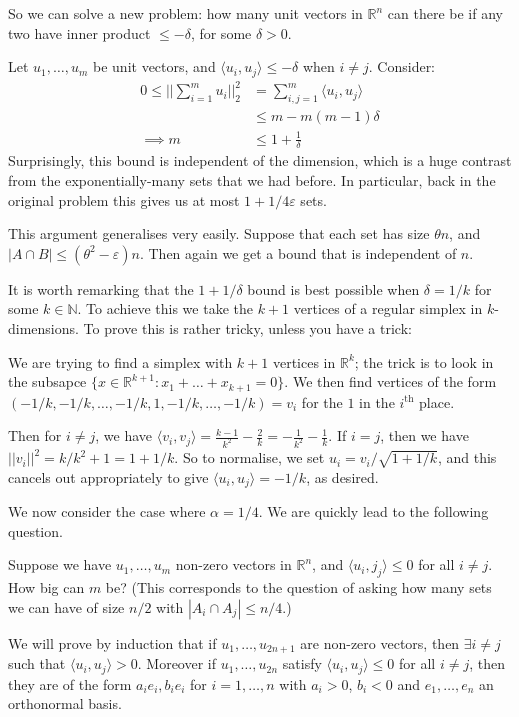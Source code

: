 \documentclass[]{article}
\theoremstyle{custhm}
\theoremstyle{cusdef}
\theoremstyle{custhm}
\theoremstyle{custhm}
\theoremstyle{custhm}
\theoremstyle{custhm}
\theoremstyle{cusdef}
\theoremstyle{remark}
\theoremstyle{custhm}
\newcommand{\N}{\mathbb{N}}
\newcommand{\R}{\mathbb{R}}
\newcommand{\eps}{\varepsilon}
\begin{document}
So we can solve a new problem: how many unit vectors in $\R^n$ can there be if any two have inner product $\le -\delta$, for some $\delta > 0$.

Let $u_1,\dots,u_m$ be unit vectors, and $\langle u_i,u_j\rangle \le -\delta$ when $i\ne j$. Consider:
\begin{align*}
0\le ||\sum_{i=1}^{m}u_i||^2_2 &= \sum_{i,j=1}^{m}\langle u_i, u_j\rangle\\
&\le m - m(m-1)\delta\\
\implies m &\le 1 + \frac{1}{\delta}
\end{align*}
Surprisingly, this bound is independent of the dimension, which is a huge contrast from the exponentially-many sets that we had before. In particular, back in the original problem this gives us at most $1 + 1/4\eps$ sets.

This argument generalises very easily. Suppose that each set has size $\theta n$, and $|A \cap B|\le (\theta^2 - \eps)n$. Then again we get a bound that is independent of $n$.

It is worth remarking that the $1 + 1/\delta$ bound is best possible when $\delta = 1/k$ for some $k \in \N$. To achieve this we take the $k+1$ vertices of a regular simplex in $k$-dimensions. To prove this is rather tricky, unless you have a trick:

We are trying to find a simplex with $k+1$ vertices in $\R^k$; the trick is to look in the subsapce $\{x\in \R^{k+1}:x_1+\dots+x_{k+1} = 0\}$. We then find vertices of the form $(-1/k,-1/k,\dots,-1/k,1,-1/k,\dots,-1/k) = v_i$ for the $1$ in the $i^{\textrm{th}}$ place.

Then for $i\ne j$, we have $\langle v_i,v_j\rangle = \frac{k-1}{k^2} - \frac{2}{k} = -\frac{1}{k^2} - \frac{1}{k}$. If $i=j$, then we have $||v_i||^2 = k/k^2 + 1 = 1 + 1/k$. So to normalise, we set $u_i = v_i/\sqrt{1+1/k}$, and this cancels out appropriately to give $\langle u_i, u_j\rangle = - 1/k$, as desired.


We now consider the case where $\alpha = 1/4$. We are quickly lead to the following question.

Suppose we have $u_1,\dots,u_m$ non-zero vectors in $\R^n$, and $\langle u_i,j_j\rangle \le 0$ for all $i\ne j$. How big can $m$ be? (This corresponds to the question of asking how many sets we can have of size $n/2$ with $|A_i\cap A_j| \le n/4$.)

We will prove by induction that if $u_1,\dots,u_{2n+1}$ are non-zero vectors, then $\exists i\ne j$ such that $\langle u_i,u_j\rangle > 0$. Moreover if $u_1,\dots,u_{2n}$ satisfy $\langle u_i,u_j\rangle \le 0$ for all $i\ne j$, then they are of the form $a_ie_i,b_ie_i$ for $i = 1,\dots,n$ with $a_i > 0$, $b_i < 0$ and $e_1,\dots,e_n$ an orthonormal basis.
\end{document}
